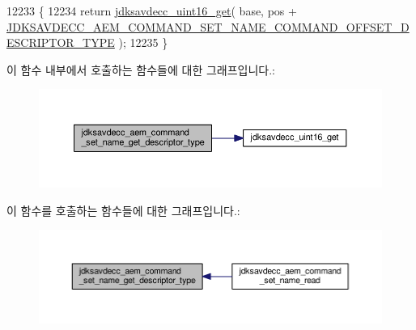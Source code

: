\begin{DoxyCode}
12233 \{
12234     \textcolor{keywordflow}{return} \hyperlink{group__endian_ga3fbbbc20be954aa61e039872965b0dc9}{jdksavdecc\_uint16\_get}( base, pos + 
      \hyperlink{group__command__set__name_ga91e53d5d14c37d26c62d74cada1323bf}{JDKSAVDECC\_AEM\_COMMAND\_SET\_NAME\_COMMAND\_OFFSET\_DESCRIPTOR\_TYPE}
       );
12235 \}
\end{DoxyCode}


이 함수 내부에서 호출하는 함수들에 대한 그래프입니다.\+:
\nopagebreak
\begin{figure}[H]
\begin{center}
\leavevmode
\includegraphics[width=350pt]{group__command__set__name_ga497a7e4d98b47ceca126a974323f71e9_cgraph}
\end{center}
\end{figure}




이 함수를 호출하는 함수들에 대한 그래프입니다.\+:
\nopagebreak
\begin{figure}[H]
\begin{center}
\leavevmode
\includegraphics[width=350pt]{group__command__set__name_ga497a7e4d98b47ceca126a974323f71e9_icgraph}
\end{center}
\end{figure}


